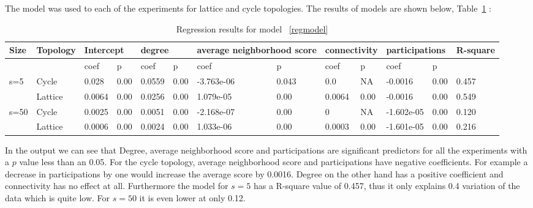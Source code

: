 The model was used to each of the experiments for lattice and cycle topologies.
The results of models are shown below, Table~\ref{regression} :

\begin{table}[!hbtp]
\centering
\begin{adjustbox}{width=1\textwidth}
\small
\begin{tabular}{@{}|l|l|l|l|l|l|l|l|l|l|l|l|l|@{}}
\toprule
Size & Topology & \multicolumn{2}{l|}{Intercept} & \multicolumn{2}{l|}{degree} & \multicolumn{2}{l|}{average neighborhood score} & \multicolumn{2}{l|}{connectivity} & \multicolumn{2}{l|}{participations} & R-square \\ \midrule
     &          & coef            & p            & coef          & p           & coef                      & p                    & coef             & p              & coef                & p             &          \\ \midrule
s=5  & Cycle    & 0.028           & 0.00         & 0.0559        & 0.00        & -3.763e-06                & 0.043                & 0.0              & NA             & -0.0016             & 0.00          & 0.457    \\ \midrule
     & Lattice  & 0.0064          & 0.00         & 0.0256        & 0.00        & 1.079e-05                 & 0.00                 & 0.0064           & 0.00           & -0.0016             & 0.00          & 0.549    \\ \midrule
s=50 & Cycle    & 0.0025          & 0.00         & 0.0051        & 0.00        & -2.168e-07                & 0.00                 & 0                & NA             & -1.602e-05          & 0.00          & 0.120    \\ \midrule
     & Lattice  & 0.0006          & 0.00         & 0.0024        & 0.00        & 1.033e-06                 & 0.00                 & 0.0003           & 0.00           & -1.601e-05          & 0.00          & 0.216    \\ \bottomrule
\end{tabular}
\end{adjustbox}
\caption{Regression results for model ~\ref{regmodel}}
\label{regression}
\end{table}

In the output we can see that Degree, average neighborhood score and participations
are significant predictors for all the experiments with a \(p\) value less than
an 0.05.
For the cycle topology, average neighborhood score and participations have negative
coefficients. For example a decrease in participations by one would increase
the average score by 0.0016. Degree on the other hand has a positive coefficient
and connectivity has no effect at all. Furthermore the model for \(s=5\) has
a R-square value of 0.457, thus it only explains 0.4 variation of the data which is
quite low. For \(s=50\) it is even lower at only 0.12.

